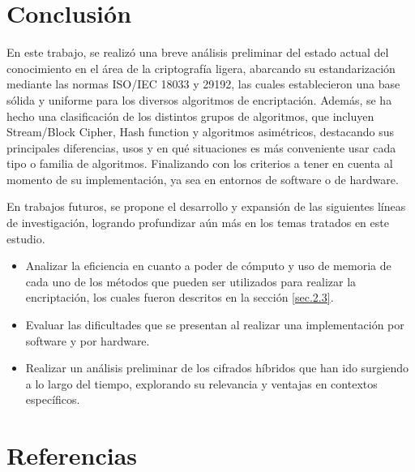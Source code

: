 \documentclass[a4paper,10pt]{article}
\begin{document}
	\section{Conclusión}
	En este trabajo, se realizó una breve análisis preliminar del estado actual del conocimiento en el área de la criptografía ligera, abarcando su estandarización mediante las normas ISO/IEC 18033 y 29192, las cuales establecieron una base sólida y uniforme para los diversos algoritmos de encriptación. Además, se ha hecho una clasificación de los distintos grupos de algoritmos, que incluyen Stream/Block Cipher, Hash function y algoritmos asimétricos, destacando sus principales diferencias, usos y en qué situaciones es más conveniente usar cada tipo o familia de algoritmos. Finalizando con los criterios a tener en cuenta al momento de su implementación, ya sea en entornos de software o de hardware.
	
	En trabajos futuros, se propone el desarrollo y expansión de las siguientes líneas de investigación, logrando profundizar aún más en los temas tratados en este estudio.
	\begin{itemize}
	\item Analizar la eficiencia en cuanto a poder de cómputo y uso de memoria de cada uno de los métodos que pueden ser utilizados para realizar la encriptación, los cuales fueron descritos en la sección \ref{sec.2.3}.
	\item Evaluar las dificultades que se presentan al realizar una implementación por software y por hardware.
	\item Realizar un análisis preliminar de los cifrados híbridos que han ido surgiendo a lo largo del tiempo, explorando su relevancia y ventajas en contextos específicos.
	\end{itemize}
	
	\section{Referencias}
	\nocite{*}
	\printbibliography[heading=none]
\end{document}
